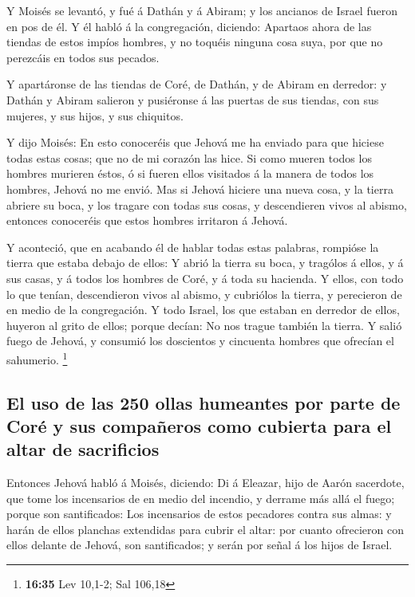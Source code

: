  Y Moisés se levantó, y fué á Dathán y á Abiram; y los
ancianos de Israel fueron en pos de él.  Y él habló á la
congregación, diciendo: Apartaos ahora de las tiendas de estos impíos
hombres, y no toquéis ninguna cosa suya, por que no perezcáis en todos
sus pecados.

 Y apartáronse de las tiendas de Coré, de Dathán, y de
Abiram en derredor: y Dathán y Abiram salieron y pusiéronse á las
puertas de sus tiendas, con sus mujeres, y sus hijos, y sus chiquitos.

 Y dijo Moisés: En esto conoceréis que Jehová me ha
enviado para que hiciese todas estas cosas; que no de mi corazón las
hice.  Si como mueren todos los hombres murieren éstos, ó
si fueren ellos visitados á la manera de todos los hombres, Jehová no me
envió.  Mas si Jehová hiciere una nueva cosa, y la tierra
abriere su boca, y los tragare con todas sus cosas, y descendieren vivos
al abismo, entonces conoceréis que estos hombres irritaron á Jehová.

 Y aconteció, que en acabando él de hablar todas estas
palabras, rompióse la tierra que estaba debajo de ellos: 
Y abrió la tierra su boca, y tragólos á ellos, y á sus casas, y á todos
los hombres de Coré, y á toda su hacienda.  Y ellos, con
todo lo que tenían, descendieron vivos al abismo, y cubriólos la tierra,
y perecieron de en medio de la congregación.  Y todo
Israel, los que estaban en derredor de ellos, huyeron al grito de ellos;
porque decían: No nos trague también la tierra.  Y salió
fuego de Jehová, y consumió los doscientos y cincuenta hombres que
ofrecían el sahumerio. \footnote{\textbf{16:35} Lev 10,1-2; Sal 106,18}

\hypertarget{el-uso-de-las-250-ollas-humeantes-por-parte-de-coruxe9-y-sus-compauxf1eros-como-cubierta-para-el-altar-de-sacrificios}{%
\subsection{El uso de las 250 ollas humeantes por parte de Coré y sus
compañeros como cubierta para el altar de
sacrificios}\label{el-uso-de-las-250-ollas-humeantes-por-parte-de-coruxe9-y-sus-compauxf1eros-como-cubierta-para-el-altar-de-sacrificios}}

 Entonces Jehová habló á Moisés, diciendo:
 Di á Eleazar, hijo de Aarón sacerdote, que tome los
incensarios de en medio del incendio, y derrame más allá el fuego;
porque son santificados:  Los incensarios de estos
pecadores contra sus almas: y harán de ellos planchas extendidas para
cubrir el altar: por cuanto ofrecieron con ellos delante de Jehová, son
santificados; y serán por señal á los hijos de Israel.

